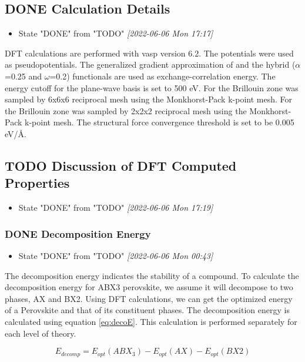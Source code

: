 \documentclass[twoside, twocolumn, 9pt, draft]{article}
\begin{document}
\subsection*{{\bfseries\sffamily DONE} Calculation Details}
\label{sec:orgd908886}
\begin{itemize}
\item State "DONE"       from "TODO"       \textit{[2022-06-06 Mon 17:17]}
\end{itemize}
DFT calculations are performed with \gls{vasp} version 6.2. The
 potentials were used as pseudopotentials. The generalized
gradient approximation  of  and the hybrid 
(\(\alpha\)=0.25 and \(\omega\)=0.2) functionals are used as
exchange-correlation energy. The energy cutoff for the plane-wave
basis is set to 500 eV. For  the Brillouin zone was sampled
by 6x6x6 reciprocal mesh using the Monkhorst-Pack k-point mesh. For
 the Brillouin zone was sampled by 2x2x2 reciprocal mesh
using the Monkhorst-Pack k-point mesh. The structural force
convergence threshold is set to be 0.005 eV/\AA{}.

\subsection*{{\bfseries\sffamily TODO} Discussion of DFT Computed Properties}
\label{sec:org21ca1fb}
\begin{itemize}
\item State "DONE"       from "TODO"       \textit{[2022-06-06 Mon 17:19]}
\end{itemize}
\subsubsection*{{\bfseries\sffamily DONE} Decomposition Energy}
\label{sec:org40f65a1}
\begin{itemize}
\item State "DONE"       from "TODO"       \textit{[2022-06-06 Mon 00:43]}
\end{itemize}
The decomposition energy indicates the stability of a compound. To
calculate the decomposition energy for ABX3 perovskite, we assume it
will decompose to two phases, AX and BX2. Using DFT calculations, we
can get the optimized energy of a Perovskite and that of its
constituent phases. The decomposition energy is calculated using
equation \eqref{eq:decoE}. This calculation is performed separately for
each level of theory.

\begin{equation}\label{eq:decoE}
E_{decomp} = E_{opt}(ABX_3) - E_{opt}(AX) - E_{opt}(BX2)
\end{equation}
\end{document}
